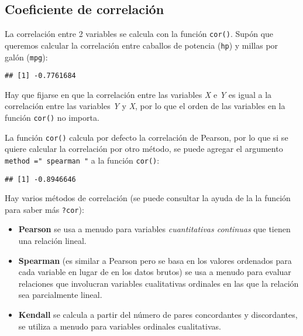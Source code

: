 \documentclass[
]{book}
\newenvironment{Shaded}{\begin{snugshade}}{\end{snugshade}}
\newcommand{\CommentTok}[1]{\textcolor[rgb]{0.56,0.35,0.01}{\textit{#1}}}
\newcommand{\DataTypeTok}[1]{\textcolor[rgb]{0.13,0.29,0.53}{#1}}
\newcommand{\KeywordTok}[1]{\textcolor[rgb]{0.13,0.29,0.53}{\textbf{#1}}}
\newcommand{\NormalTok}[1]{#1}
\newcommand{\OperatorTok}[1]{\textcolor[rgb]{0.81,0.36,0.00}{\textbf{#1}}}
\newcommand{\StringTok}[1]{\textcolor[rgb]{0.31,0.60,0.02}{#1}}
\providecommand{\tightlist}{%
  \setlength{\itemsep}{0pt}\setlength{\parskip}{0pt}}
\begin{document}
\hypertarget{coeficiente-de-correlaciuxf3n}{%
\subsection{Coeficiente de correlación}\label{coeficiente-de-correlaciuxf3n}}

La correlación entre 2 variables se calcula con la función \texttt{cor()}. Supón que queremos calcular la correlación entre caballos de potencia (\texttt{hp}) y millas por galón (\texttt{mpg}):

\begin{Shaded}
\end{Shaded}

\begin{verbatim}
## [1] -0.7761684
\end{verbatim}

Hay que fijarse en que la correlación entre las variables \emph{X} e \emph{Y} es igual a la correlación entre las variables \emph{Y} y \emph{X}, por lo que el orden de las variables en la función \texttt{cor()} no importa.

La función \texttt{cor()} calcula por defecto la correlación de Pearson, por lo que si se quiere calcular la correlación por otro método, se puede agregar el argumento \texttt{method\ ="\ spearman\ "} a la función \texttt{cor()}:

\begin{Shaded}
\end{Shaded}

\begin{verbatim}
## [1] -0.8946646
\end{verbatim}

Hay varios métodos de correlación (se puede consultar la ayuda de la la función para saber más \texttt{?cor}):

\begin{itemize}
\tightlist
\item
  \textbf{Pearson} se usa a menudo para variables \emph{cuantitativas continuas} que tienen una relación lineal.
\item
  \textbf{Spearman} (es similar a Pearson pero se basa en los valores ordenados para cada variable en lugar de en los datos brutos) se usa a menudo para evaluar relaciones que involucran variables cualitativas ordinales en las que la relación sea parcialmente lineal.
\item
  \textbf{Kendall} se calcula a partir del número de pares concordantes y discordantes, se utiliza a menudo para variables ordinales cualitativas.
\end{itemize}
\end{document}
